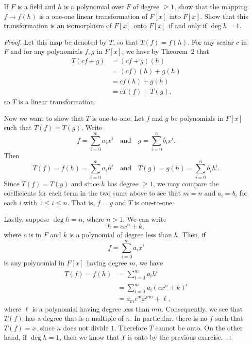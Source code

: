  If $F$ is a field and $h$ is a polynomial over $F$ of
degree $\geq1$, show that the mapping $f\to f(h)$ is a one-one linear
transformation of $F[x]$ into $F[x]$. Show that this transformation is
an isomorphism of $F[x]$ onto $F[x]$ if and only if $\deg h = 1$.
\begin{proof}
  Let this map be denoted by $T$, so that $T(f) = f(h)$. For any
  scalar $c$ in $F$ and for any polynomials $f,g$ in $F[x]$, we have
  by Theorem~2 that
  \begin{align*}
    T(cf + g)
    &= (cf + g)(h) \\
    &= (cf)(h) + g(h) \\
    &= cf(h) + g(h) \\
    &= cT(f) + T(g),
  \end{align*}
  so $T$ is a linear transformation.

  Now we want to show that $T$ is one-to-one. Let $f$ and $g$ be
  polynomials in $F[x]$ such that $T(f) = T(g)$. Write
  \begin{equation*}
    f = \sum_{i=0}^ma_ix^i \quad\text{and}\quad g = \sum_{i=0}^nb_ix^i.
  \end{equation*}
  Then
  \begin{equation*}
    T(f) = f(h) = \sum_{i=0}^ma_ih^i
    \quad\text{and}\quad
    T(g) = g(h) = \sum_{i=0}^nb_ih^i.
  \end{equation*}
  Since $T(f) = T(g)$ and since $h$ has degree $\geq1$, we may compare
  the coefficients for each term in the two sums above to see that
  $m = n$ and $a_i = b_i$ for each $i$ with $1\leq i\leq n$. That is,
  $f = g$ and $T$ is one-to-one.

  Lastly, suppose $\deg h = n$, where $n > 1$. We can write
  \begin{equation*}
    h = cx^n + k,
  \end{equation*}
  where $c$ is in $F$ and $k$ is a polynomial of degree less than
  $h$. Then, if
  \begin{equation*}
    f = \sum_{i=0}^ma_ix^i
  \end{equation*}
  is any polynomial in $F[x]$ having degree $m$, we have
  \begin{align*}
    T(f) = f(h)
    &= \sum_{i=0}^ma_ih^i \\
    &= \sum_{i=0}^ma_i(cx^n + k)^i \\
    &= a_mc^mx^{mn} + \ell,
  \end{align*}
  where $\ell$ is a polynomial having degree less than
  $mn$. Consequently, we see that $T(f)$ has a degree that is a
  multiple of $n$. In particular, there is no $f$ such that
  $T(f) = x$, since $n$ does not divide $1$. Therefore $T$ cannot be
  onto. On the other hand, if $\deg h = 1$, then we know that $T$ is
  onto by the previous exercise.
\end{proof}
